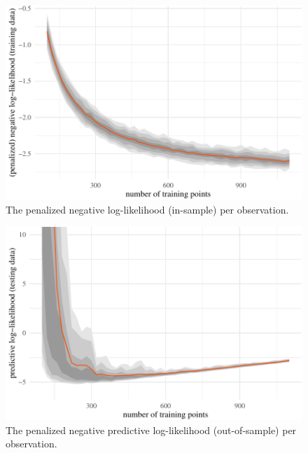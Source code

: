 \documentclass[11pt]{article}
\begin{document}
\begin{figure}[t]

{\centering \includegraphics{gfx/pen-negll-1} 

}

\caption{The penalized negative log-likelihood (in-sample) per observation.}\label{fig:pen-negll}
\end{figure}

\begin{figure}[t]

{\centering \includegraphics{gfx/predict-negll-1} 

}

\caption{The penalized negative predictive log-likelihood (out-of-sample) per observation.}\label{fig:predict-negll}
\end{figure}
\end{document}
